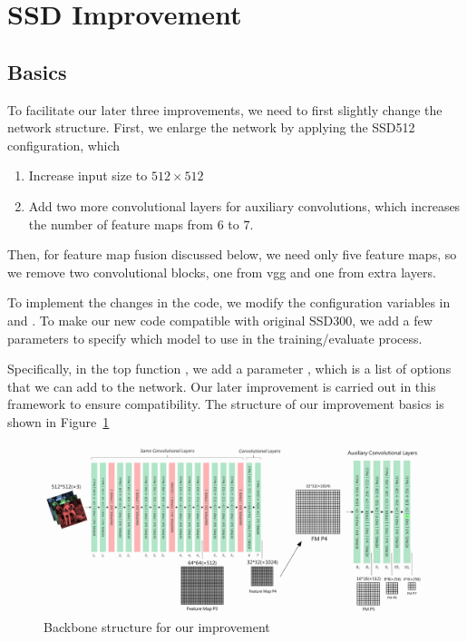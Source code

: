 \documentclass[journal,conference]{IEEEtran}
\begin{document}






\section{SSD Improvement}
\subsection{Basics}
To facilitate our later three improvements, we need to first slightly change the network structure. First, we enlarge the network by applying the SSD512 configuration, which
\begin{enumerate}
  \item Increase input size to $512\times 512$
  \item Add two more convolutional layers for auxiliary convolutions, which increases the number of feature maps from $6$ to $7$.
\end{enumerate}

Then, for feature map fusion discussed below, we need only five feature maps, so we remove two convolutional blocks, one from vgg and one from extra layers.

To implement the changes in the code, we modify the configuration variables in  and . To make our new code compatible with original SSD300, we add a few parameters to specify which model to use in the training/evaluate process.

Specifically, in the top function , we add a parameter , which is a list of options that we can add to the network. Our later improvement is carried out in this framework to ensure compatibility. The structure of our improvement basics is shown in Figure~\ref{fig:basics}

\begin{figure}[htbp]
  \centering
  \includegraphics[width=\linewidth]{fig/basics.png}
  \caption{Backbone structure for our improvement}\label{fig:basics}
\end{figure}
\end{document}
